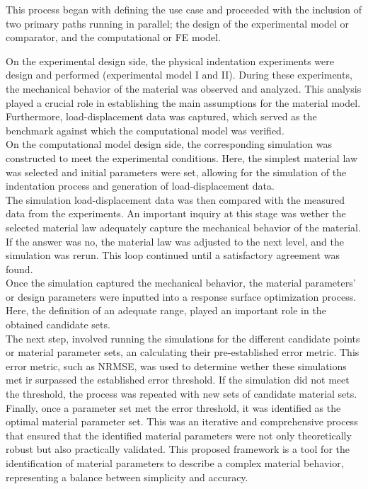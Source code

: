This process began with defining the use case and proceeded with the inclusion of two primary paths
running in parallel; the design of the experimental model or comparator, and the computational or FE model.

On the experimental design side, the physical indentation experiments were design and performed (experimental 
model I and II). During these experiments, the mechanical behavior of the material was observed and analyzed.
This analysis played a crucial role in establishing the main assumptions for the material model. Furthermore, 
load-displacement data was captured, which served as the benchmark 
against which the computational model was verified.\\

On the computational model design side, the corresponding simulation was constructed to meet the experimental 
conditions. Here, the simplest material law was selected and initial parameters were set, allowing for the simulation of 
the indentation process and generation of load-displacement data.\\

The simulation load-displacement data was then compared with the measured data from the experiments.
An important inquiry at this stage was wether the selected material law adequately capture the mechanical 
behavior of the material. If the answer was no, the material law was adjusted to the next level, and the 
simulation was rerun. This loop continued until a satisfactory agreement was found.\\

Once the simulation captured the mechanical behavior, the material parameters' or design parameters were inputted into a 
response surface optimization process. Here, the definition of an adequate range, played an important role 
in the obtained candidate sets.\\ 

The next step, involved running the simulations for the different candidate points or material parameter sets,
an calculating their pre-established error metric. This error metric, such as NRMSE, was used to determine 
wether these simulations met ir surpassed the established error threshold. If the simulation did not meet the threshold, 
the process was repeated with new sets of candidate material sets.\\

Finally, once a parameter set met the error threshold, it was identified as the optimal material parameter set.
This was an iterative and comprehensive process that ensured that the identified material 
parameters were not only theoretically robust but also practically validated.
This proposed framework is a tool for the identification of material parameters to describe a complex material behavior,
representing a balance between simplicity and accuracy. 


